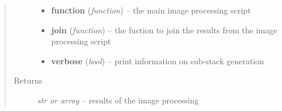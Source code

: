 \documentclass[letterpaper,10pt,english]{sphinxmanual}
\begin{document}
\begin{fulllineitems}
\begin{quote}
\begin{description}
\begin{itemize}
\item {} 
\textbf{function} (\emph{function}) --
the main image processing script

\item {} 
\textbf{join} (\emph{function}) --
the fuction to join the results from the image processing script

\item {} 
\textbf{verbose} (\emph{bool}) --
print information on sub-stack generation

\end{itemize}

\item[{Returns}] \leavevmode
\emph{str or array} --
results of the image processing

\end{description}\end{quote}

\end{fulllineitems}

\end{document}

